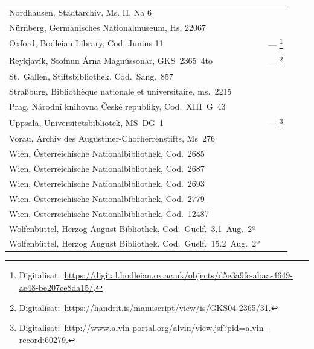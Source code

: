 \noindent
\begin{tabularx}{\linewidth}{@{} >{\raggedright\arraybackslash}X l @{}}
Nordhausen, Stadtarchiv, Ms. II, Na 6
	& \autocite[1379]{hsc} \\
Nürnberg, Germanisches Nationalmuseum, Hs. 22067
	& \autocite[1189]{hsc} \\
Oxford, Bodleian Library, Cod. Junius 11
	& ---%
	\footnote{Digitalisat:~\url{https://digital.bodleian.ox.ac.uk/objects/d5e3a9fc-abaa-4649-ae48-be207ce8da15/}.}
	\\
Reykjavík, Stofnun Árna Magnússonar, GKS~2365~4to
	& ---%
	\footnote{Digitalisat:~\url{https://handrit.is/manuscript/view/is/GKS04-2365/31}.}
	\\
St.~Gallen, Stiftsbibliothek, Cod.~Sang.~857
	& \autocite[1211]{hsc} \\
Straßburg, Bibliothèque nationale et universitaire, ms.~2215
	& \autocite[1828]{hsc} \\
Prag, Národní knihovna České republiky, Cod.~XIII~G~43
	& \autocite[1168]{hsc} \\
Uppsala, Universitetsbibliotek, MS~DG~1
	& ---%
	\footnote{Digitalisat:~\url{http://www.alvin-portal.org/alvin/view.jsf?pid=alvin-record:60279}.}
	\\
Vorau, Archiv des Augustiner-Chorherrenstifts, Ms~276
	& \autocite[1432]{hsc} \\
Wien, Österreichische Nationalbibliothek, Cod.~2685
	& \autocite[2013]{hsc} \\
Wien, Österreichische Nationalbibliothek, Cod.~2687
	& \autocite[6494]{hsc} \\
Wien, Österreichische Nationalbibliothek, Cod.~2693
	& \autocite[1215]{hsc} \\
Wien, Österreichische Nationalbibliothek, Cod.~2779
	& \autocite[2693]{hsc} \\
Wien, Österreichische Nationalbibliothek, Cod.~12487
	& \autocite[3394]{hsc} \\
Wolfenbüttel, Herzog August Bibliothek, Cod.~Guelf.~3.1~Aug.~2º
	& \autocite[8396]{hsc} \\
Wolfenbüttel, Herzog August Bibliothek, Cod.~Guelf.~15.2~Aug.~2º
	& \autocite[6668]{hsc} \\
\end{tabularx}
